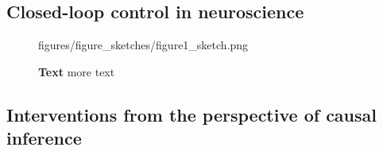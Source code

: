 \subsection{Closed-loop control in neuroscience}

\begin{figure}[ht]
	\centering
	 \begin{overpic}[width=.6\textwidth]{figures/figure_sketches/figure1_sketch.png}
	  \end{overpic}
    \caption{\textbf{Text} more text}

    \label{fig:overview} %
 \end{figure}


\subsection{Interventions from the perspective of causal inference}
